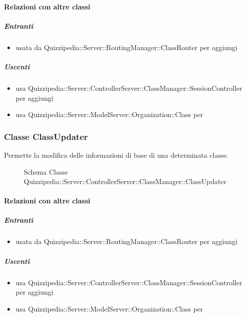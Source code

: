 \paragraph{Relazioni con altre classi}
\subparagraph{Entranti}
\begin{itemize}
\item usata da Quizzipedia::Server::RoutingManager::ClassRouter per aggiungi
\end{itemize}
\subparagraph{Uscenti}
\begin{itemize}
\item usa Quizzipedia::Server::ControllerServer::ClassManager::SessionController per aggiungi
\item usa Quizzipedia::Server::ModelServer::Organization::Class per 
\end{itemize}
\subsubsection{Classe ClassUpdater}
Permette la modifica delle informazioni di base di una determinata classe.
\begin{figure}[H]
\centering
\noindent{}
\caption[Schema Classe ClassUpdater]{Schema Classe Quizzipedia::Server::ControllerServer::ClassManager::ClassUpdater}
\end{figure}
\paragraph{Relazioni con altre classi}
\subparagraph{Entranti}
\begin{itemize}
\item usata da Quizzipedia::Server::RoutingManager::ClassRouter per aggiungi
\end{itemize}
\subparagraph{Uscenti}
\begin{itemize}
\item usa Quizzipedia::Server::ControllerServer::ClassManager::SessionController per aggiungi
\item usa Quizzipedia::Server::ModelServer::Organization::Class per 
\end{itemize}
